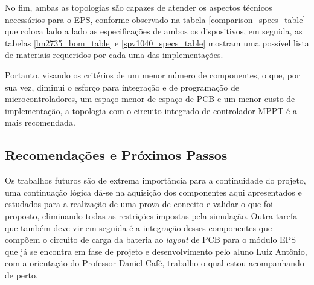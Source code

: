 



No fim, ambas as topologias são capazes de atender os aspectos técnicos necessários para o EPS, conforme observado na tabela \ref{comparison_specs_table} que coloca lado a lado as especificações de ambos os dispositivos, em seguida, as tabelas \ref{lm2735_bom_table} e \ref{spv1040_specs_table} mostram uma possível lista de materiais requeridos por cada uma das implementações.



Portanto, visando os critérios de um menor número de componentes, o que, por sua vez, diminui o esforço para integração e de programação de microcontroladores, um espaço menor de espaço de PCB e um menor custo de implementação, a topologia com o circuito integrado de controlador MPPT é a mais recomendada.

\subsection*{Recomendações e Próximos Passos}

Os trabalhos futuros são de extrema importância para a continuidade do projeto, uma continuação lógica dá-se na aquisição dos componentes aqui apresentados e estudados para a realização de uma prova de conceito e validar o que foi proposto, eliminando todas as restrições impostas pela simulação. Outra tarefa que também deve vir em seguida é a integração desses componentes que compõem o circuito de carga da bateria ao \textit{layout} de PCB para o módulo EPS que já se encontra em fase de projeto e desenvolvimento pelo aluno Luiz Antônio, com a orientação do Professor Daniel Café, trabalho o qual estou acompanhando de perto.

